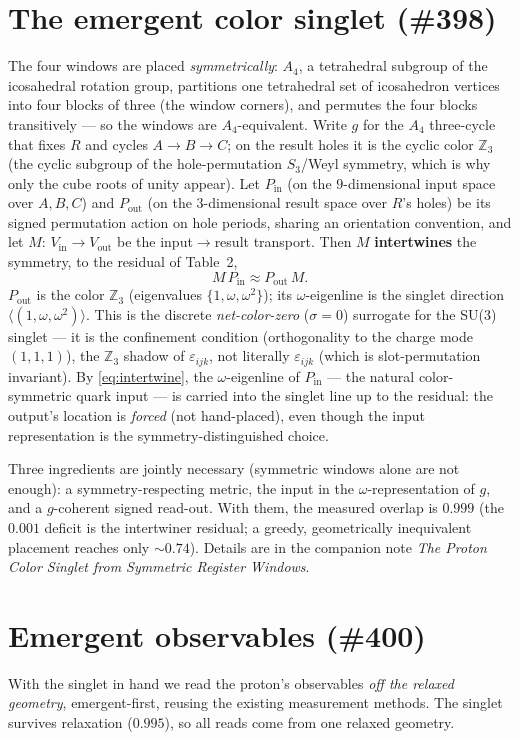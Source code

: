 \documentclass[11pt]{article}
\newcommand{\Z}{\mathbb{Z}}
\newcommand{\sigmacol}{\sigma}
\newcommand{\Pin}{P_{\mathrm{in}}}
\newcommand{\Pout}{P_{\mathrm{out}}}
\begin{document}
\section{The emergent color singlet (\#398)}
The four windows are placed \emph{symmetrically}: $A_4$, a tetrahedral subgroup of the
icosahedral rotation group, partitions one tetrahedral set of icosahedron vertices
into four blocks of three (the window corners), and permutes the four blocks
transitively --- so the windows are $A_4$-equivalent. Write $g$ for the $A_4$
three-cycle that fixes $R$ and cycles $A\to B\to C$; on the result holes it is the
cyclic color $\Z_3$ (the cyclic subgroup of the hole-permutation $S_3$/Weyl symmetry,
which is why only the cube roots of unity appear). Let $\Pin$ (on the $9$-dimensional
input space over $A,B,C$) and $\Pout$ (on the $3$-dimensional result space over $R$'s
holes) be its signed permutation action on hole periods, sharing an orientation
convention, and let $M:\,V_{\mathrm{in}}\to V_{\mathrm{out}}$ be the input$\to$result
transport. Then $M$ \textbf{intertwines} the symmetry, to the residual of Table~2,
\begin{equation}
  M\,\Pin \approx \Pout\,M .
  \label{eq:intertwine}
\end{equation}
$\Pout$ is the color $\Z_3$ (eigenvalues $\{1,\omega,\omega^2\}$); its
$\omega$-eigenline is the singlet direction $\langle(1,\omega,\omega^2)\rangle$. This
is the discrete \emph{net-color-zero} ($\sigmacol=0$) surrogate for the SU(3) singlet
--- it is the confinement condition (orthogonality to the charge mode $(1,1,1)$),
the $\Z_3$ shadow of $\varepsilon_{ijk}$, not literally $\varepsilon_{ijk}$ (which is
slot-permutation invariant). By \eqref{eq:intertwine}, the $\omega$-eigenline of
$\Pin$ --- the natural color-symmetric quark input --- is carried into the singlet
line up to the residual: the output's location is \emph{forced} (not hand-placed),
even though the input representation is the symmetry-distinguished choice.

Three ingredients are jointly necessary (symmetric windows alone are not enough): a
symmetry-respecting metric, the input in the $\omega$-representation of $g$, and a
$g$-coherent signed read-out. With them, the measured overlap is $0.999$ (the $0.001$
deficit is the intertwiner residual; a greedy, geometrically inequivalent placement
reaches only $\sim0.74$). Details are in the companion note \emph{The Proton Color
Singlet from Symmetric Register Windows}.

\section{Emergent observables (\#400)}
With the singlet in hand we read the proton's observables \emph{off the relaxed
geometry}, emergent-first, reusing the existing measurement methods. The singlet
survives relaxation ($0.995$), so all reads come from one relaxed geometry.
\end{document}
